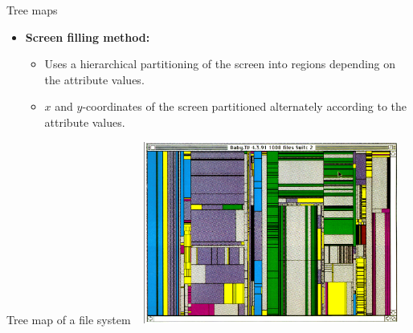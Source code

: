 \documentclass[aspectratio=169,t]{beamer}
\begin{document}
  { 
    \begin{frame}{Tree maps}
    \centering
    \begin{itemize}
      \item \textbf{Screen filling method:}
      \begin{itemize}
        \item Uses a hierarchical partitioning of the screen into regions depending on the attribute values.
        \item $x$ and $y$-coordinates of the screen partitioned alternately according to the attribute values.
      \end{itemize}
    \end{itemize}
    \end{frame}
  }

  { 
    \begin{frame}{Tree map of a file system}
    \centering
    \vspace{0.5cm}
    \includegraphics[width=9cm, height=6cm]{img/treemap_filesystem.png}
    \end{frame}
  }
\end{document}
